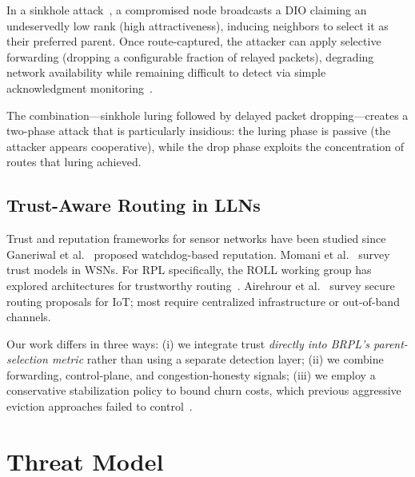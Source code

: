 \documentclass[conference]{IEEEtran}
\begin{document}
In a sinkhole attack~\cite{karlof2003}, a compromised node broadcasts a DIO
claiming an undeservedly low rank (high attractiveness), inducing neighbors
to select it as their preferred parent.
Once route-captured, the attacker can apply selective forwarding
(dropping a configurable fraction of relayed packets),
degrading network availability while remaining difficult to detect
via simple acknowledgment monitoring~\cite{marti2000}.

The combination---sinkhole luring followed by delayed packet dropping---creates
a two-phase attack that is particularly insidious:
the luring phase is passive (the attacker appears cooperative),
while the drop phase exploits the concentration of routes that luring achieved.

\subsection{Trust-Aware Routing in LLNs}

Trust and reputation frameworks for sensor networks have been studied since
Ganeriwal et al.~\cite{airtime_trust} proposed watchdog-based reputation.
Momani et al.~\cite{Momani2010} survey trust models in WSNs.
For RPL specifically, the ROLL working group has explored
architectures for trustworthy routing~\cite{roll_trust}.
Airehrour et al.~\cite{smtrust} survey secure routing proposals for IoT;
most require centralized infrastructure or out-of-band channels.

Our work differs in three ways:
(i) we integrate trust \emph{directly into BRPL's parent-selection metric}
rather than using a separate detection layer;
(ii) we combine forwarding, control-plane, and congestion-honesty signals;
(iii) we employ a conservative stabilization policy to bound churn costs,
which previous aggressive eviction approaches failed to control~\cite{dvir2011}.

\section{Threat Model}
\label{sec:threat}
\end{document}
